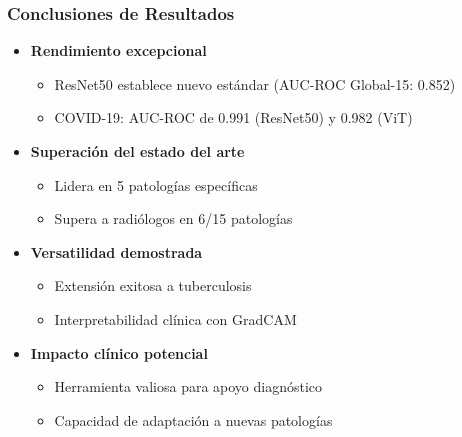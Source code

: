 \begin{frame}
\frametitle{Conclusiones de Resultados}
\begin{itemize}
    \item \textbf{Rendimiento excepcional}
    \begin{itemize}
        \item ResNet50 establece nuevo estándar (AUC-ROC Global-15: 0.852)
        \item COVID-19: AUC-ROC de 0.991 (ResNet50) y 0.982 (ViT)
    \end{itemize}
    \item \textbf{Superación del estado del arte}
    \begin{itemize}
        \item Lidera en 5 patologías específicas
        \item Supera a radiólogos en 6/15 patologías
    \end{itemize}
    \item \textbf{Versatilidad demostrada}
    \begin{itemize}
        \item Extensión exitosa a tuberculosis
        \item Interpretabilidad clínica con GradCAM
    \end{itemize}
    \item \textbf{Impacto clínico potencial}
    \begin{itemize}
        \item Herramienta valiosa para apoyo diagnóstico
        \item Capacidad de adaptación a nuevas patologías
    \end{itemize}
\end{itemize}
\end{frame}
